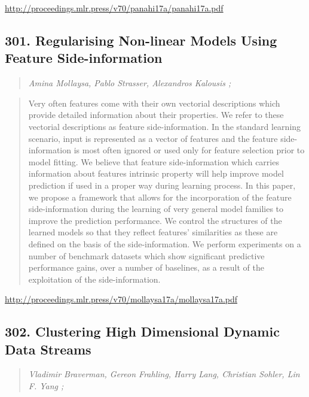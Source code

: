 \documentclass{article}
\begin{document}
\href{http://proceedings.mlr.press/v70/panahi17a/panahi17a.pdf}{http://proceedings.mlr.press/v70/panahi17a/panahi17a.pdf}

\subsection{301. Regularising Non-linear Models Using Feature Side-information}

\begin{quote}
\footnotesize{\textit{Amina Mollaysa, Pablo Strasser, Alexandros Kalousis ;}}
\end{quote}

\begin{quote}
    Very often features come with their own vectorial descriptions which provide detailed information about their properties. We refer to these vectorial descriptions as feature side-information. In the standard learning scenario, input is represented as a vector of features and the feature side-information is most often ignored or used only for feature selection prior to model fitting. We believe that feature side-information which carries information about features intrinsic property will help improve model prediction if used in a proper way during learning process. In this paper, we propose a framework that allows for the incorporation of the feature side-information during the learning of very general model families to improve the prediction performance. We control the structures of the learned models so that they reflect features’ similarities as these are defined on the basis of the side-information. We perform experiments on a number of benchmark datasets which show significant predictive performance gains, over a number of baselines, as a result of the exploitation of the side-information.  \end{quote}

\href{http://proceedings.mlr.press/v70/mollaysa17a/mollaysa17a.pdf}{http://proceedings.mlr.press/v70/mollaysa17a/mollaysa17a.pdf}

\subsection{302. Clustering High Dimensional Dynamic Data Streams}

\begin{quote}
\footnotesize{\textit{Vladimir Braverman, Gereon Frahling, Harry Lang, Christian Sohler, Lin F. Yang ;}}
\end{quote}
\end{document}
